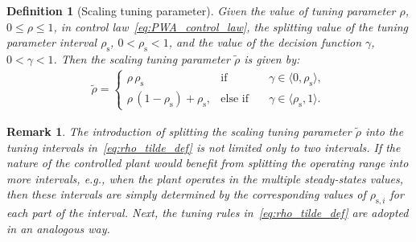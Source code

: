 \documentclass[preprint,12pt]{elsarticle}
\newtheorem{remark}[theorem]{Remark}
\newtheorem{definition}{Definition}[section]
\begin{document}
	\begin{definition}[Scaling tuning parameter]
		\label{def:rho_tilde}
		Given the value of tuning parameter $\rho$, $0 \leq \rho \leq 1$, in control law~\eqref{eq:PWA_control_law}, the splitting value of the tuning parameter interval $\rho_{\mathrm{s}}$, $0 < \rho_{\mathrm{s}} < 1$, and the value of the decision function $\gamma$, $0 < \gamma < 1$. Then the scaling tuning parameter $\widetilde{\rho}$ is given by:		
		\begin{eqnarray}
			\label{eq:rho_tilde_def}
			\widetilde{\rho} = \left\{ 
			\begin{matrix}
				\rho \, \rho_{\mathrm{s}} & \mathrm{if} & \quad \gamma \in \langle 0, \rho_{\mathrm{s}} \rangle , \\
				\rho \, (1-\rho_{\mathrm{s}}) + \rho_{\mathrm{s}}, & \mathrm{else}\,\,\mathrm{if} &\quad \gamma \in \langle \rho_{\mathrm{s}}, 1 \rangle.
			\end{matrix}
			\right.
		\end{eqnarray}
		\end{definition}


	
	\begin{remark}
	\label{rem:rho_tilde}		
		The introduction of splitting the scaling tuning parameter $\widetilde{\rho}$ into the tuning intervals in~\eqref{eq:rho_tilde_def} is not limited only to two intervals. If the nature of the controlled plant would benefit from splitting the operating range into more intervals, e.g., when the plant operates in the multiple steady-states values, then these intervals are simply determined by the corresponding values of $\rho_{\mathrm{s}, i}$ for each part of the interval. Next, the tuning rules in~\eqref{eq:rho_tilde_def} are adopted in an analogous way.
	\end{remark}
	
\end{document}

